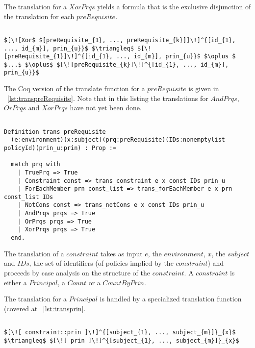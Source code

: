 The translation for a $XorPrqs$ yields a formula that is the exclusive disjunction of the translation for each $preRequisite$.


\lstset{mathescape, language=AST}  
\begin{lstlisting}[frame=single, caption={Prerequisite Translation {$\colon$} Exclusive Disjunction},label={lst:transpreRequisiteXorPrqs}]

$[\![Xor$ $[preRequisite_{1}, ..., preRequisite_{k}]]\!]^{[id_{1}, ..., id_{m}], prin_{u}}$ $\triangleq$ $[\![preRequisite_{1}]\!]^{[id_{1}, ..., id_{m}], prin_{u}}$ $\oplus $ $...$ $\oplus$ $[\![preRequisite_{k}]\!]^{[id_{1}, ..., id_{m}], prin_{u}}$

\end{lstlisting}

The Coq version of the translate function for a $preRequisite$ is given in ~\ref{lst:transpreRequisite}. Note that in this listing the translations for $AndPrqs$, $OrPrqs$ and $XorPrqs$ have not yet been done.

\begin{lstlisting}

Definition trans_preRequisite
  (e:environment)(x:subject)(prq:preRequisite)(IDs:nonemptylist policyId)(prin_u:prin) : Prop := 

  match prq with
    | TruePrq => True
    | Constraint const => trans_constraint e x const IDs prin_u 
    | ForEachMember prn const_list => trans_forEachMember e x prn const_list IDs 
    | NotCons const => trans_notCons e x const IDs prin_u 
    | AndPrqs prqs => True 
    | OrPrqs prqs => True 
    | XorPrqs prqs => True 
  end.
\end{lstlisting}



The translation of a $constraint$ takes as input $e$, the $environment$, $x$, the $subject$ and $IDs$, the set of identifiers (of policies implied by the $constraint$) and proceeds by case analysis on the structure of the $constraint$. A $constraint$ is either a $Principal$, a $Count$ or a $CountByPrin$.

The translation for a $Principal$ is handled by a specialized translation function (covered at ~\ref{lst:transprin}.   

\lstset{mathescape, language=AST}  
\begin{lstlisting}[frame=single, caption={Constraint Translation {$\colon$} Principal},label={lst:transconstraintPrin}]

$[\![ constraint::prin ]\!]^{[subject_{1}, ..., subject_{m}]}_{x}$ $\triangleq$ $[\![ prin ]\!]^{[subject_{1}, ..., subject_{m}]}_{x}$ 
\end{lstlisting}

